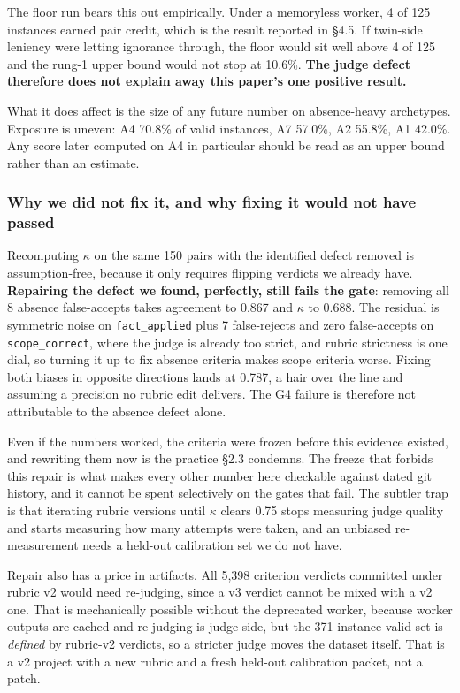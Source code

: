 \documentclass[11pt]{article}
\newcommand{\code}[1]{\texttt{\small #1}}
\begin{document}
The floor run bears this out empirically. Under a memoryless worker, 4 of 125
instances earned pair credit, which is the result reported in \S4.5. If twin-side
leniency were letting ignorance through, the floor would sit well above 4 of 125
and the rung-1 upper bound would not stop at 10.6\%. \textbf{The judge defect therefore does not explain away this
paper's one positive result.}

What it does affect is the size of any future number on absence-heavy archetypes.
Exposure is uneven: A4 70.8\% of valid instances, A7 57.0\%, A2 55.8\%, A1
42.0\%. Any score later computed on A4 in particular should be read as an upper
bound rather than an estimate.

\subsubsection*{Why we did not fix it, and why fixing it would not have passed}

Recomputing $\kappa$ on the same 150 pairs with the identified defect removed is
assumption-free, because it only requires flipping verdicts we already have.
\textbf{Repairing the defect we found, perfectly, still fails the gate}: removing
all 8 absence false-accepts takes agreement to 0.867 and $\kappa$ to 0.688. The
residual is symmetric noise on \code{fact\_applied} plus 7 false-rejects and zero
false-accepts on \code{scope\_correct}, where the judge is already too strict,
and rubric strictness is one dial, so turning it up to fix absence criteria makes
scope criteria worse. Fixing both biases in opposite directions lands at 0.787, a
hair over the line and assuming a precision no rubric edit delivers. The G4
failure is therefore not attributable to the absence defect alone.

Even if the numbers worked, the criteria were frozen before this evidence
existed, and rewriting them now is the practice \S2.3 condemns. The freeze that
forbids this repair is what makes every other number here checkable against
dated git history, and it cannot be spent selectively on the gates that fail.
The subtler trap is that iterating rubric versions until $\kappa$ clears 0.75
stops measuring judge quality and starts measuring how many attempts were taken,
and an unbiased re-measurement needs a held-out calibration set we do not have.

Repair also has a price in artifacts. All 5{,}398 criterion verdicts committed
under rubric v2 would need re-judging, since a v3 verdict cannot be mixed with a
v2 one. That is mechanically possible without the deprecated worker, because
worker outputs are cached and re-judging is judge-side, but the 371-instance
valid set is \emph{defined} by rubric-v2 verdicts, so a stricter judge moves the
dataset itself. That is a v2 project with a new rubric and a fresh held-out
calibration packet, not a patch.
\end{document}

